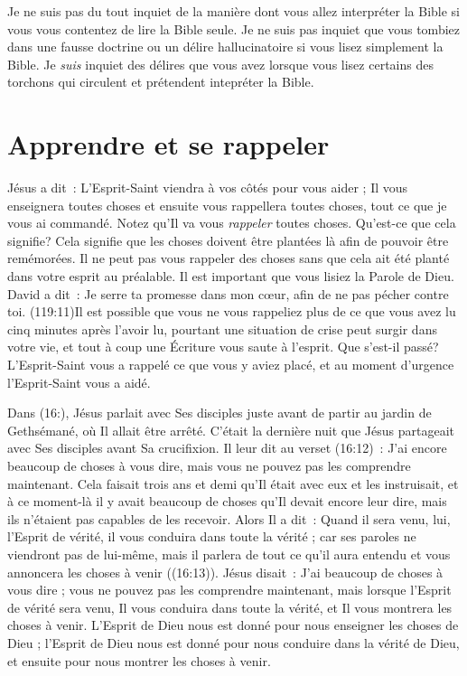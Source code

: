 Je ne suis pas du tout inquiet de la manière dont vous allez interpréter
 la Bible si vous vous contentez de lire la Bible seule.
 Je ne suis pas inquiet que vous tombiez dans une fausse doctrine
 ou un délire hallucinatoire si vous lisez simplement la Bible.
 Je \emph{suis} inquiet des délires que vous avez lorsque vous lisez certains
 des torchons qui circulent et prétendent intepréter la Bible.


\section{Apprendre et se rappeler}

Jésus a dit~: \og L'Esprit-Saint viendra à vos côtés pour vous aider ;
 Il vous enseignera toutes choses et ensuite vous rappellera toutes choses,
 tout ce que je vous ai commandé. \fg{}
 Notez qu'Il va vous \emph{rappeler} toutes choses.
 Qu'est-ce que cela signifie? Cela signifie que les choses
 doivent être plantées là afin de pouvoir être remémorées.
 Il ne peut pas vous rappeler des choses sans que cela ait été planté
 dans votre esprit au préalable. Il est important que vous lisiez
 la Parole de Dieu. David a dit~: \og Je serre ta promesse dans mon cœur,
 afin de ne pas pécher contre toi. \fg{}
 (119:11)Il est possible que vous ne vous rappeliez
 plus de ce que vous avez lu
 cinq minutes après l'avoir lu, pourtant une situation de crise
 peut surgir dans votre vie, et tout à coup une Écriture vous saute
 à l'esprit. Que s'est-il passé? L'Esprit-Saint vous a rappelé
 ce que vous y aviez placé, et au moment d'urgence l'Esprit-Saint
 vous a aidé.

Dans (16:), Jésus parlait avec Ses disciples juste avant
 de partir au jardin de Gethsémané, où Il allait être arrêté.
 C'était la dernière nuit que Jésus partageait avec Ses disciples
 avant Sa crucifixion.
 Il leur dit au verset (16:12)~:
 \og J'ai encore beaucoup de choses à vous dire,
 mais vous ne pouvez pas les comprendre maintenant. \fg{}
 Cela faisait trois ans et demi qu'Il était avec eux et les instruisait,
 et à ce moment-là il y avait beaucoup de choses qu'Il devait encore
 leur dire, mais ils n'étaient pas capables de les recevoir.
 Alors Il a dit~: \og Quand il sera venu, lui, l'Esprit de vérité,
 il vous conduira dans toute la vérité ; car ses paroles ne viendront pas
 de lui-même, mais il parlera de tout ce qu'il aura entendu et vous annoncera
 les choses à venir \fg{} ((16:13)).
 Jésus disait~: \og J'ai beaucoup de choses à vous dire ; vous ne pouvez pas
 les comprendre maintenant, mais lorsque l'Esprit de vérité sera venu,
 Il vous conduira dans toute la vérité, et Il vous montrera les choses
 à venir. \fg{}
 L'Esprit de Dieu nous est donné pour nous enseigner les choses de Dieu ;
 l'Esprit de Dieu nous est donné pour nous conduire dans la vérité de Dieu,
 et ensuite pour nous montrer les choses à venir.


